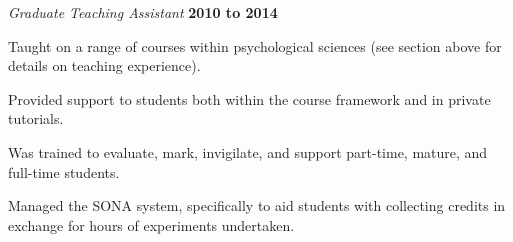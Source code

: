 \begin{outerlist}


\item[] \textit{Graduate Teaching Assistant}
        \hfill \textbf{2010 to 2014}
\begin{innerlist}
\item Taught on a range of courses within psychological sciences (see section above for details on teaching experience).
\item Provided support to students both within the course framework and in private tutorials.
\item Was trained to evaluate, mark, invigilate, and support part-time, mature, and full-time students.
\item Managed the SONA system, specifically to aid students with collecting credits in exchange for hours of experiments undertaken.
\end{innerlist}


\end{outerlist}

% 
% 


% 


